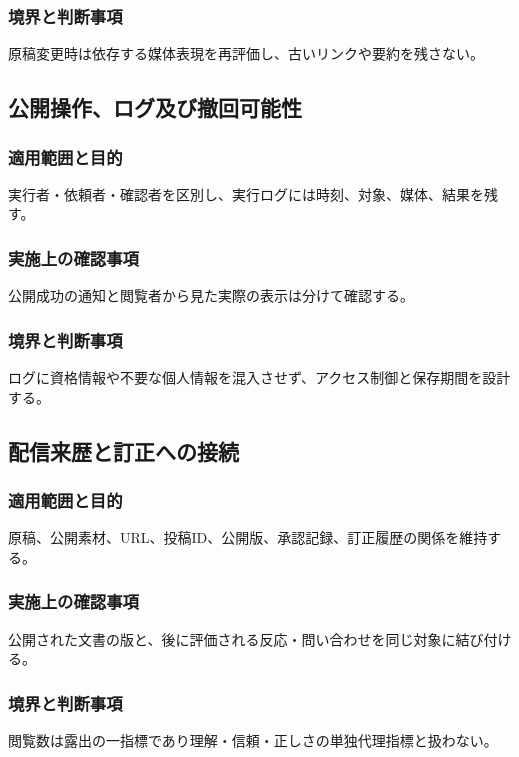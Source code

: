 \documentclass[a4paper,11pt]{article}
\begin{document}
\subsubsection{境界と判断事項}
\par 原稿変更時は依存する媒体表現を再評価し、古いリンクや要約を残さない。\par\medskip
\subsection{公開操作、ログ及び撤回可能性}
\subsubsection{適用範囲と目的}
\par 実行者・依頼者・確認者を区別し、実行ログには時刻、対象、媒体、結果を残す。\par\medskip
\subsubsection{実施上の確認事項}
\par 公開成功の通知と閲覧者から見た実際の表示は分けて確認する。\par\medskip
\subsubsection{境界と判断事項}
\par ログに資格情報や不要な個人情報を混入させず、アクセス制御と保存期間を設計する。\par\medskip
\subsection{配信来歴と訂正への接続}
\subsubsection{適用範囲と目的}
\par 原稿、公開素材、URL、投稿ID、公開版、承認記録、訂正履歴の関係を維持する。\par\medskip
\subsubsection{実施上の確認事項}
\par 公開された文書の版と、後に評価される反応・問い合わせを同じ対象に結び付ける。\par\medskip
\subsubsection{境界と判断事項}
\par 閲覧数は露出の一指標であり理解・信頼・正しさの単独代理指標と扱わない。\par\medskip
\end{document}
